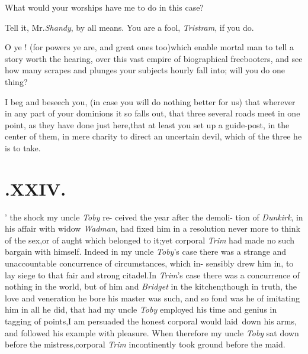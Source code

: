 \documentclass{article}
\begin{document}
\tsh What would your worships have me to do in this case?

\tsk Tell it, Mr.\@ \textit{Shandy}, by all means.\break
\tsh You are a fool, \textit{Tristram}, if you do.

O ye ! (for powers ye are, and great ones too)\tsk which
enable mortal man to tell a story worth the
hearing,\break
{}
over this vast empire of biographical free\-booters, and see how many scrapes and plunges your
subjects hourly fall into;\tsh\break
will you do one thing?

I beg and beseech you, (in case you
will do nothing better for us) that wherever in any part of your
dominions it so falls out, that three several roads meet in one
point, as they have done just here,\tsk that at least you set up
a guide-post, in the center of them, in mere charity to direct
an uncertain devil, which of the three he is to take.

\section{.\quad  XXIV.}

’ the shock my uncle \textit{Toby} re-\break
ceived the year after the demoli-\break
tion of \textit{Dunkirk}, in his affair with widow \textit{Wadman}, had fixed
him in a resolution never more to think of the sex,\tsk or of
aught which belonged to it;\tsk yet corporal \textit{Trim} had made
no such bargain with himself. Indeed in my uncle
\textit{Toby}’s case there was a strange and unaccountable
concurrence of circumstances, which in- sensibly drew him in, to lay
siege to that fair and strong citadel.\tsh In
\textit{Trim}’s case there was a concurrence of nothing in the
world, but of him and \textit{Bridget} in the kitchen;\tsk though
in truth, the love and veneration he bore his master was such, and
so fond was he of imitating him in all he did, that had my uncle \textit{Toby}
employed his time and genius in tagging of points,\tsh I am
persuaded the honest corporal would laid\sic\ down his arms, and
followed his example with pleasure. When therefore my uncle
\textit{Toby} sat down before the mistress,\tsk corporal \textit{Trim}
incontinently took ground before the maid.
\end{document}
